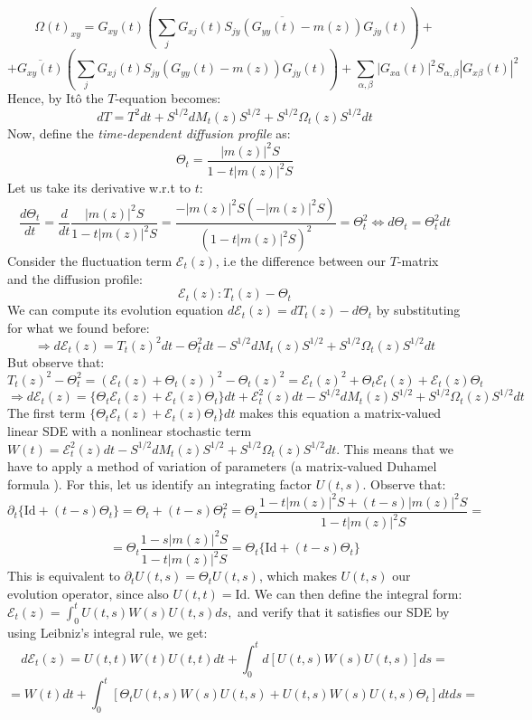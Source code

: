 \documentclass[11pt]{article}
\newcommand{\E}{\mathcal{E}}
\begin{document}
$$\Omega(t)_{xy}=G_{xy}(t)\left(\overline{\sum_j G_{xj}(t)S_{jy}(G_{yy}(t)-m(z))G_{jy}(t)}\right)+$$
$$+\overline{G_{xy}(t)}\left(\sum_j G_{xj}(t)S_{jy}(G_{yy}(t)-m(z))G_{jy}(t)\right)+\sum_{\alpha, \beta}|G_{xa}(t)|^2S_{\alpha, \beta}|G_{x\beta}(t)|^2$$
Hence, by Itô the $T$-equation becomes: 
\begin{equation*}
d{T} = {T}^2 dt + S^{1/2} dM_t(z)S^{1/2} + S^{1/2} \Omega_t(z) S^{1/2}dt \tag{3.1}
\end{equation*}
Now, define the \textit{time-dependent diffusion profile} as:$$\Theta_t = \frac{|m(z)|^2S}{1-t|m(z)|^2S}$$
Let us take its derivative w.r.t to $t$: 
$$\frac{d\Theta_t}{dt} = \frac{d}{dt}\frac{|m(z)|^2S}{1-t|m(z)|^2S} = \frac{-|m(z)|^2S(-|m(z)|^2S)}{(1-t|m(z)|^2S)^2} = \Theta_t^2 \Leftrightarrow d\Theta_t = \Theta_t^2 dt$$
Consider the fluctuation term $\mathcal{E}_t(z)$, i.e the difference between our $T$-matrix and the diffusion profile:
$$\E_t(z):T_t(z)-\Theta_t$$
We can compute its evolution equation $d\E_t(z) = dT_t(z)-d\Theta_t$ by substituting for what we found before:
$$\Rightarrow d\E_t(z) = T_t(z)^2dt - \Theta_t^2dt-S^{1/2}dM_t(z)S^{1/2}+S^{1/2}\Omega_t(z)S^{1/2}dt$$
But observe that:
$$T_t(z)^2-\Theta_t^2 =(\E_t(z)+\Theta_t(z))^2- \Theta_t(z)^2=\E_t(z)^2+\Theta_t\E_t(z)+\E_t(z)\Theta_t$$
\begin{equation*}\Rightarrow d\E_t(z)=\{\Theta_t \E_t(z)+\E_t(z)\Theta_t\}dt +\E_t^2(z)dt - S^{1/2} dM_t(z)S^{1/2} + S^{1/2}
 \Omega_t(z) S^{1/2}dt\tag{3.2}\end{equation*}
The first term $\{\Theta_t \E_t(z)+\E_t(z)\Theta_t\}dt$ makes this equation a matrix-valued linear SDE with a nonlinear stochastic term $W(t) = \E_t^2(z)dt - S^{1/2} dM_t(z)S^{1/2} + S^{1/2} \Omega_t(z) S^{1/2}dt$. This means that we have to apply a method of variation of parameters (a matrix-valued Duhamel formula \cite{bandSDE}). For this, let us identify an integrating factor $U(t, s)$. Observe that: 
$$\partial_{t}\{\text{Id}+(t-s)\Theta_t\} = \Theta_t+(t-s)\Theta_t^2=\Theta_t\frac{1-t|m(z)|^2S+(t-s)|m(z)|^2S}{1-t|m(z)|^2S}=$$
$$=\Theta_t \frac{1-s|m(z)|^2S}{1-t|m(z)|^2S}=\Theta_t\{\text{Id}+(t-s)\Theta_t\}$$
This is equivalent to $\partial_t U(t, s) = \Theta_t U(t, s)$, which makes $U(t, s)$ our evolution operator, since also $U(t, t) = \text{Id}$. We can then define the integral form: $\E_t(z) = \int_0^t U(t, s) W(s) U(t, s)ds,$ and verify that it satisfies our SDE by using Leibniz's integral rule, we get:
$$d\E_t(z) = U(t, t) W(t) U(t, t)dt + \int_0^t d\left[U(t, s)W(s)U(t, s)\right]ds=$$
$$=W(t)dt + \int_0^t\left[\Theta_t U(t, s) W(s) U(t, s) + U(t, s)W(s)U(t, s)\Theta_t\right]dtds =$$
\end{document}
